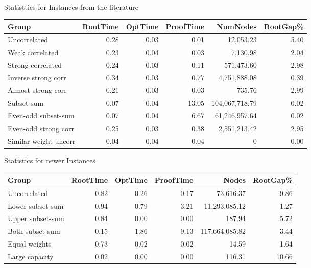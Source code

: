 \documentclass[fleqn,11pt,aspectratio=43]{beamer}
\begin{document}
\begin{frame}{Statisttics for Instances from the literature}
\scriptsize
\begin{tabularx}{\textwidth}{l R R R R R}
\textbf{Group} & \textbf{RootTime} & \textbf{OptTime} & \textbf{ProofTime} & \textbf{NumNodes} & \textbf{RootGap\%} \\
\hline
Uncorrelated           & 0.28 & 0.03 & 0.01 & 12,053.23      & 5.40 \\
Weak correlated        & 0.23 & 0.04 & 0.03 & 7,130.98       & 2.04 \\
Strong correlated      & 0.24 & 0.03 & 0.11 & 571,473.60     & 2.98 \\
Inverse strong corr    & 0.34 & 0.03 & 0.77 & 4,751,888.08   & 0.39 \\
Almost strong corr     & 0.21 & 0.03 & 0.03 & 735.76         & 2.99 \\
Subset-sum             & 0.07 & 0.04 & 13.05 & 104,067,718.79 & 0.02 \\
Even-odd subset-sum    & 0.07 & 0.04 & 6.67  & 61,246,957.64  & 0.02 \\
Even-odd strong corr   & 0.25 & 0.03 & 0.38  & 2,551,213.42   & 2.95 \\
Similar weight uncorr  & 0.04 & 0.04 & 0.04  & 0              & 0.00 \\
\end{tabularx}
\end{frame}


\begin{frame}{Statistics for newer Instances}
\scriptsize
\begin{tabularx}{\textwidth}{l R R R R R}
\textbf{Group} & \textbf{RootTime} & \textbf{OptTime} & \textbf{ProofTime} & \textbf{Nodes} & \textbf{RootGap\%} \\
\hline
Uncorrelated         & 0.82 & 0.26 & 0.17 & 73,616.37        & 9.86 \\
Lower subset-sum     & 0.94 & 0.79 & 3.21 & 11,293,085.12     & 1.27 \\
Upper subset-sum     & 0.84 & 0.00 & 0.00 & 187.94           & 5.72 \\
Both subset-sum      & 0.15 & 1.86 & 9.13 & 117,664,085.82    & 3.44 \\
Equal weights        & 0.73 & 0.02 & 0.02 & 14.59            & 1.64 \\
Large capacity       & 0.02 & 0.00 & 0.00 & 116.31           & 10.66 \\
\end{tabularx}
\end{frame}
\end{document}
